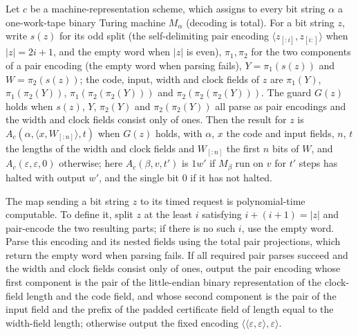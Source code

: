 \begin{definition}
\label{Complexity.tmsatResult}
\leanok
{}
Let $c$ be a machine-representation scheme, which assigns to every bit string $\alpha$ a one-work-tape binary Turing machine $M_\alpha$ (decoding is total). For a bit string $z$, write $s(z)$ for its odd split (the self-delimiting pair encoding $\langle z_{[:i]}, z_{[i:]}\rangle$ when $|z| = 2i+1$, and the empty word when $|z|$ is even), $\pi_1, \pi_2$ for the two components of a pair encoding (the empty word when parsing fails), $Y = \pi_1(s(z))$ and $W = \pi_2(s(z))$; the code, input, width and clock fields of $z$ are $\pi_1(Y)$, $\pi_1(\pi_2(Y))$, $\pi_1(\pi_2(\pi_2(Y)))$ and $\pi_2(\pi_2(\pi_2(Y)))$. The guard $G(z)$ holds when $s(z)$, $Y$, $\pi_2(Y)$ and $\pi_2(\pi_2(Y))$ all parse as pair encodings and the width and clock fields consist only of ones. Then the result for $z$ is $A_c(\alpha, \langle x, W_{[:n]}\rangle, t)$ when $G(z)$ holds, with $\alpha$, $x$ the code and input fields, $n$, $t$ the lengths of the width and clock fields and $W_{[:n]}$ the first $n$ bits of $W$, and $A_c(\varepsilon,\varepsilon,0)$ otherwise; here $A_c(\beta, v, t')$ is $1w'$ if $M_\beta$ run on $v$ for $t'$ steps has halted with output $w'$, and the single bit $0$ if it has not halted.
\end{definition}

\begin{lemma}
\label{Complexity.tmsat_request_poly}
\leanok
{}
The map sending a bit string $z$ to its timed request is polynomial-time computable. To
define it, split $z$ at the least $i$ satisfying $i+(i+1)=|z|$ and pair-encode the two
resulting parts; if there is no such $i$, use the empty word. Parse this encoding and
its nested fields using the total pair projections, which return the empty word when
parsing fails. If all required pair parses succeed and the width and clock fields
consist only of ones, output the pair encoding whose first component is the pair of the
little-endian binary representation of the clock-field length and the code field, and
whose second component is the pair of the input field and the prefix of the padded
certificate field of length equal to the width-field length; otherwise output the fixed
encoding $\langle\langle\varepsilon,\varepsilon\rangle,\varepsilon\rangle$.
\end{lemma}

